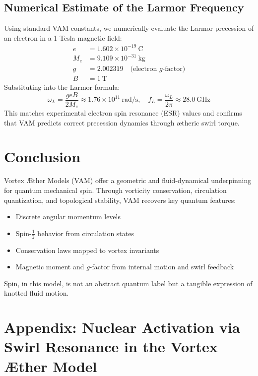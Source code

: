 \documentclass[a4paper, aps,preprint,superscriptaddress, 12pt]{revtex4}
\begin{document}
\subsection*{Numerical Estimate of the Larmor Frequency}
Using standard VAM constants, we numerically evaluate the Larmor precession of an electron in a 1 Tesla magnetic field:
\begin{align*}
    e &= 1.602 \times 10^{-19}~\text{C} \\
    M_e &= 9.109 \times 10^{-31}~\text{kg} \\
    g &= 2.002319 \quad \text{(electron $g$-factor)} \\
    B &= 1~\text{T}
\end{align*}
Substituting into the Larmor formula:
\begin{equation}
    \omega_L = \frac{g e B}{2 M_e} \approx 1.76 \times 10^{11}~\text{rad/s}, \quad
    f_L = \frac{\omega_L}{2\pi} \approx 28.0~\text{GHz}
\end{equation}
This matches experimental electron spin resonance (ESR) values and confirms that VAM predicts correct precession dynamics through ætheric swirl torque.

\section*{Conclusion}

Vortex Æther Models (VAM) offer a geometric and fluid-dynamical underpinning for quantum mechanical spin. Through vorticity conservation, circulation quantization, and topological stability, VAM recovers key quantum features:

\begin{itemize}

\item Discrete angular momentum levels

\item Spin-$\tfrac{1}{2}$ behavior from circulation states

\item Conservation laws mapped to vortex invariants

\item Magnetic moment and $g$-factor from internal motion and swirl feedback

\end{itemize}

Spin, in this model, is not an abstract quantum label but a tangible expression of knotted fluid motion.
\section{Appendix: Nuclear Activation via Swirl Resonance in the Vortex Æther Model}
\end{document}
